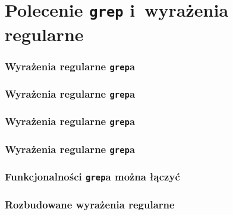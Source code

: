 \documentclass[10pt,t]{beamer}
\begin{document}
\section{Polecenie \texttt{grep} i~wyrażenia regularne}


\begin{frame}
  \frametitle{Wyrażenia regularne \texttt{grep}a}




\end{frame}





\begin{frame}
  \frametitle{Wyrażenia regularne \texttt{grep}a}


\end{frame}





\begin{frame}
  \frametitle{Wyrażenia regularne \texttt{grep}a}




\end{frame}





\begin{frame}
  \frametitle{Wyrażenia regularne \texttt{grep}a}



\end{frame}





\begin{frame}
  \frametitle{Funkcjonalności \texttt{grep}a można łączyć}



\end{frame}





\begin{frame}
  \frametitle{Rozbudowane wyrażenia regularne}



\end{frame}
\end{document}
